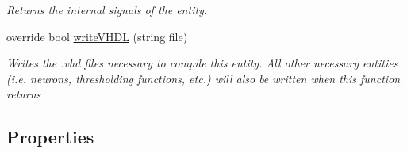 \begin{DoxyCompactItemize}
\begin{DoxyCompactList}\small\item\em Returns the internal signals of the entity. \end{DoxyCompactList}\item 
override bool \hyperlink{class_n_n_gen_1_1_async_neural_network_ad57a90889256277e0da34e8e7f3e7848}{write\+V\+H\+D\+L} (string file)
\begin{DoxyCompactList}\small\item\em Writes the .vhd files necessary to compile this entity. All other necessary entities (i.\+e. neurons, thresholding functions, etc.) will also be written when this function returns \end{DoxyCompactList}\end{DoxyCompactItemize}
\subsection*{Properties}
